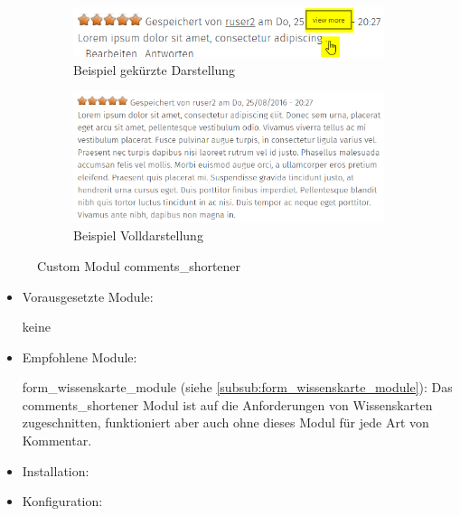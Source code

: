 \begin{figure}[H]
	\centering
	\begin{subfigure}{0.45\textwidth}
		\centering
		\includegraphics[width=0.95\linewidth]{images/example_commentsshortener}
		\caption[]{Beispiel gekürzte Darstellung}
		\label{fig:example_commentshortener_short}
	\end{subfigure}
	\begin{subfigure}{0.45\textwidth}
		\centering
		\includegraphics[width=0.95\linewidth]{images/example_commentsshortener_full}
		\caption[]{Beispiel Volldarstellung}
		\label{fig:example_commentshortener_full}
	\end{subfigure}
	\caption{Custom Modul comments\_shortener}
	\label{fig:example_commentsshortener}
\end{figure}

\begin{itemize}[parsep=0pt, itemsep=5.0pt plus 2.0pt minus 1.0pt, leftmargin=*]
	\item Vorausgesetzte Module:

	keine


	\item Empfohlene Module:

	form\_wissenskarte\_module (siehe \cref{subsub:form_wissenskarte_module}): Das comments\_shortener Modul ist auf die Anforderungen von Wissenskarten zugeschnitten, funktioniert aber auch ohne dieses Modul für jede Art von Kommentar.


	\item Installation: \standardinstall

	\item Konfiguration:

	\noconfig

\end{itemize}



